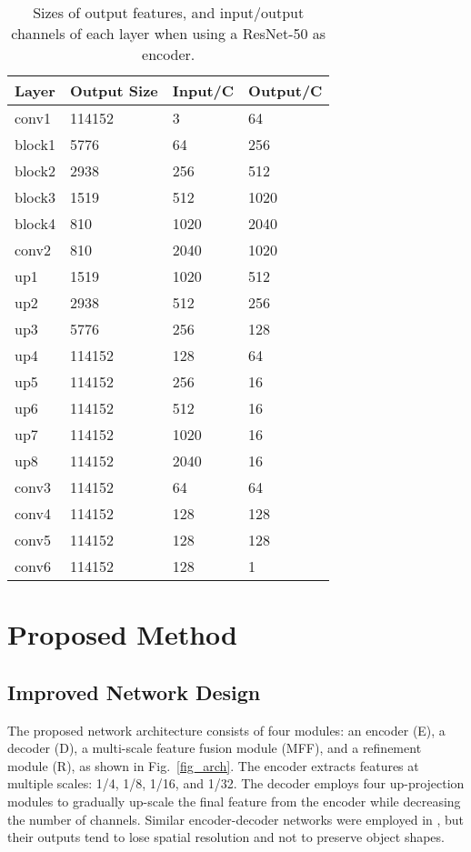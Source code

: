 \documentclass[10pt,twocolumn,letterpaper]{article}
\begin{document}
\begin{table}[t]
\centering  
\caption{Sizes of output features, and input/output channels of each layer when using a ResNet-50 as encoder.}
\begin{tabular}{|l|p{}<{\centering}|p{}<{\centering}|p{}<{\centering}|} 
\hline 
Layer  &Output Size   &Input/C &Output/C \\ 
\hline\hline
conv1  &114152 &3 &64 \\
block1   &5776 &64 &256 \\
block2  &2938  &256 &512 \\  
block3  &1519  &512 &1020 \\  
block4  &810  &1020 &2040 \\  \hline
conv2   &810  &2040 &1020 \\  
up1   &1519 &1020 &512 \\ 
up2  &2938 &512 &256 \\ 
up3   &5776 &256 &128 \\ 
up4  &114152 &128 &64 \\  \hline
up5  &114152 &256 &16 \\ 
up6  &114152 &512 &16 \\ 
up7  &114152 &1020 &16 \\ 
up8  &114152 &2040 &16 \\ 
conv3 &114152  &64 &64 \\ \hline
conv4 &114152  &128 &128 \\
conv5 &114152  &128 &128\\
conv6 &114152  &128 &1 \\ \hline
\end{tabular}
\label{table_arch}
\end{table}

\section{Proposed Method}
\subsection{Improved Network Design}

The proposed network architecture consists of four modules: an encoder (E), a decoder (D), a multi-scale feature fusion module (MFF), and a refinement module (R), as shown in Fig.~\ref{fig_arch}. The encoder extracts features at multiple scales: 1/4, 1/8, 1/16, and 1/32. 
The decoder employs four up-projection modules \cite{laina2016deeper} to gradually up-scale the final feature from the encoder while decreasing the number of channels. Similar encoder-decoder networks were employed in \cite{laina2016deeper,ma2017sparse}, but
their outputs tend to lose spatial resolution and not to preserve object shapes. 
\end{document}

